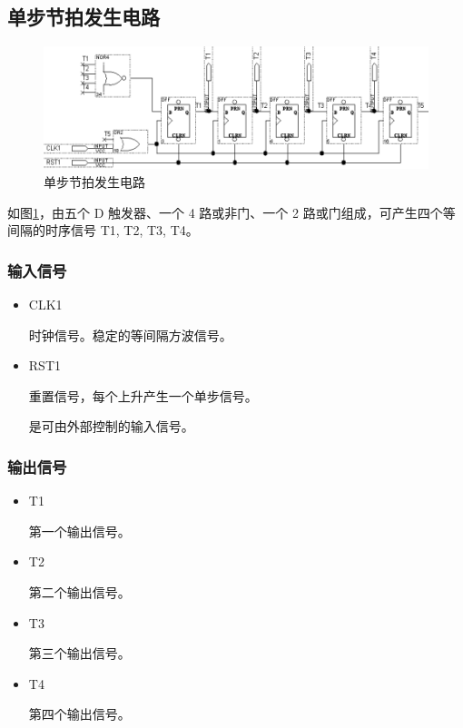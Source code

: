 \subsection{单步节拍发生电路}

\begin{figure}[h]
\centering
\includegraphics[width=\textwidth]{images/prin1_2.png}
\caption{单步节拍发生电路}
\label{fig:prin1_2}
\end{figure}

如图\ref{fig:prin1_2}，由五个 D 触发器、一个 4 路或非门、一个 2 路或门组成，可产生四个等间隔的时序信号 T1, T2, T3, T4。

\subsubsection{输入信号}

\begin{itemize}
    \item CLK1
    
    时钟信号。稳定的等间隔方波信号。
    
    \item RST1
    
    重置信号，每个上升产生一个单步信号。
    
    是可由外部控制的输入信号。
    
\end{itemize} 

\subsubsection{输出信号}

\begin{itemize}
    \item T1
    
    第一个输出信号。
    
    \item T2
    
    第二个输出信号。

    \item T3

    第三个输出信号。

    \item T4
    
    第四个输出信号。

\end{itemize}

